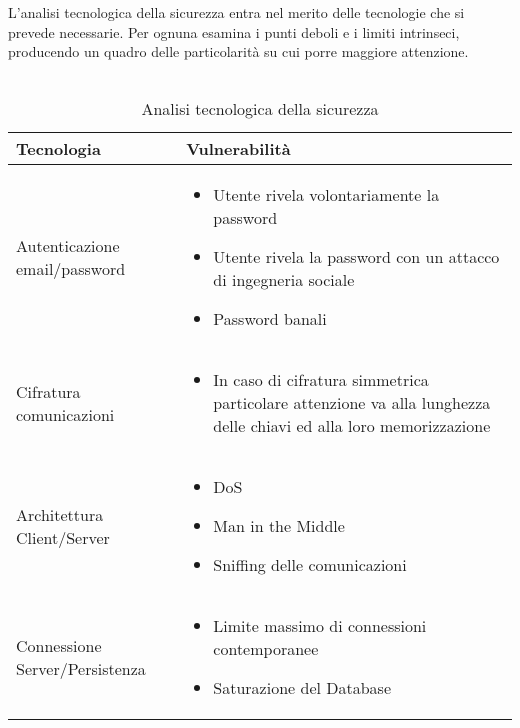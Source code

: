 \clearpage

L'analisi tecnologica della sicurezza entra nel merito delle tecnologie che si prevede necessarie.
Per ognuna esamina i punti deboli e i limiti intrinseci, 
producendo un quadro delle particolarità su cui porre maggiore attenzione.\\
\\


\begin{table}[htbp]
    \centering
    \begin{tabular} {|P{4cm}|P{12cm}|}
        \hline
        Tecnologia                     & Vulnerabilità                                            \\
        \hline
        Autenticazione email/password  &
        \begin{itemize} 
            \item Utente rivela volontariamente la password
            \item Utente rivela la password con un attacco di ingegneria sociale
            \item Password banali        
        \end{itemize}                                                                 \\
        \hline
        Cifratura comunicazioni        &
        \begin{itemize}
            \item In caso di cifratura simmetrica particolare attenzione va alla lunghezza delle chiavi ed alla loro memorizzazione   
        \end{itemize}                   \\
        \hline
        Architettura Client/Server     & 
        \begin{itemize} 
            \item DoS
            \item Man in the Middle
            \item Sniffing delle comunicazioni  
        \end{itemize}                                                           \\
        \hline
        Connessione Server/Persistenza & \begin{itemize} 
            \item Limite massimo di connessioni contemporanee
            \item Saturazione del Database     
        \end{itemize}                                                            \\
        \hline
    \end{tabular}
    \caption{Analisi tecnologica della sicurezza}
    \label{<label>}
\end{table}

